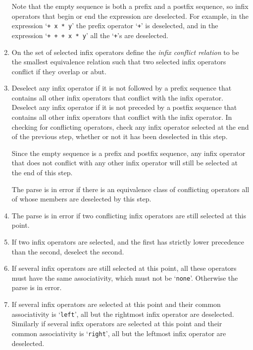\documentclass[12pt]{article}
\newcommand{\key}[1]{{\em #1}\index{#1}}
\begin{document}
\begin{enumerate}
Note that the empty sequence is both a prefix and a postfix sequence,
so infix operators that begin or end the expression are deselected.
For example, in the expression `\verb|+ x * y|' the prefix operator
`\verb|+|' is
deselected, and in the expression `\verb|+ + + x * y|' all the `\verb|+|'s are
deselected.

\item
On the set of selected infix operators define the \key{infix conflict relation}
to be the smallest equivalence relation such that two selected infix operators
conflict if they overlap or abut.

\item
Deselect any infix operator if it is not followed by a prefix sequence that
contains all other infix operators that conflict with the infix operator.
Deselect any infix operator if it is not preceded by a postfix sequence that
contains all other infix operators that conflict with the infix operator.
In checking for conflicting operators, check any infix operator selected
at the end of the previous step, whether or not it has been deselected
in this step.

Since the empty sequence is a prefix and postfix sequence, any infix operator
that does not conflict with any other infix operator will still be selected
at the end of this step.

The parse is in error if there is an equivalence class of
conflicting operators all
of whose members are deselected by this step.

\item
The parse is in error if two conflicting infix operators are still selected at
this point.

\item
If two infix operators are selected, and the first has strictly lower
precedence than the second, deselect the second.

\item
If several infix operators are still selected at this point, all these
operators must have the same associativity, which must not be `\verb|none|'.
Otherwise the parse is in error.

\item
If several infix operators are selected at this point and their common
associativity is `\verb|left|', all but the rightmost infix operator
are deselected.
Similarly if several infix operators are selected at this point and their common
associativity is `\verb|right|', all but the leftmost infix operator
are deselected.


\end{enumerate}
\end{document}
